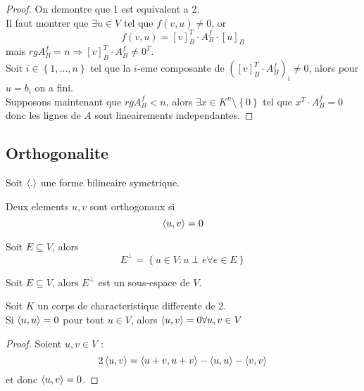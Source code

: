 \documentclass[../main.tex]{subfiles}
\begin{document}
\begin{proof}
On demontre que 1 est equivalent a 2.\\
Il faut montrer que $\exists u \in V $ tel que $f( v,u) \neq 0$, or
\[ 
	f( v,u) = [ v] _B ^{T} \cdot A_B^{f} \cdot [ u] _B
\]
mais $rg A_B^{f}=n \Rightarrow  [ v]_B^{T}\cdot A_B^{f}\neq 0^{T}$.\\
Soit $i \in  \left\{ 1, \ldots, n \right\} $ tel que la $i$-eme composante de $( [v]_B^{T}\cdot A_B^{f} )_i \neq 0$, alors pour $u=b_i$ on a fini.\\
Supposons maintenant que $rg A_{B} ^{f}<n$, alors
$\exists x \in K^{n}\setminus \left\{ 0 \right\} $ tel que $x^{T}\cdot A_B^{f}=0$ \\
donc les lignes de $A$ sont lineairements independantes.
\end{proof}
\subsection{Orthogonalite}
Soit $\left\langle.\right\rangle$ une forme bilineaire symetrique.
\begin{defn}[Orthogonalite]
	Deux elements $u,v$ sont orthogonaux si
	\[ 
	\left\langle u,v\right\rangle =0
	\]
	
	
\end{defn}
\begin{defn}
	Soit $E \subseteq V$, alors
	\[ 
	E^{\perp}= \left\{ u \in V: u \perp e \forall e  \in E \right\} 
	\]
	
	
\end{defn}
\begin{propo}
Soit $E \subseteq V$, alors $E^{\perp}$ est un sous-espace de $V$.
\end{propo}
\begin{lemma}
Soit $K$ un corps de characteristique differente de 2.\\
Si $ \left\langle u,u \right\rangle =0$ pour tout $u \in V$, alors $\left\langle u,v\right\rangle =0 \forall u,v \in V$
\end{lemma}
\begin{proof}
Soient $u,v \in V$ :
\[ 
2 \left\langle u,v\right\rangle = \left\langle u+v, u+v\right\rangle - \left\langle u,u\right\rangle - \left\langle v,v\right\rangle 
\]
et donc $\left\langle u,v \right\rangle =0$.

\end{proof}
\end{document}
